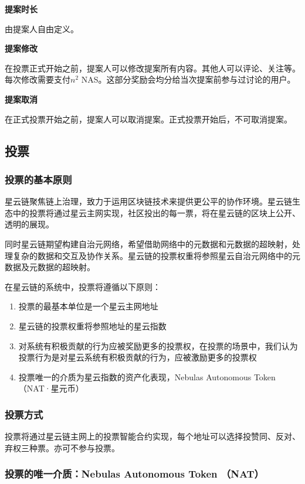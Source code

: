\textbf{提案时长}

由提案人自由定义。

\textbf{提案修改}

在投票正式开始之前，提案人可以修改提案所有内容。其他人可以评论、关注等。每次修改需要支付$n^2$ NAS。这部分奖励会均分给当次提案前参与过讨论的用户。

\textbf{提案取消}

在正式投票开始之前，提案人可以取消提案。正式投票开始后，不可取消提案。

\subsection{投票}
\subsubsection{投票的基本原则}

星云链聚焦链上治理，致力于运用区块链技术来提供更公平的协作环境。星云链生态中的投票将通过星云主网实现，社区投出的每一票，将在星云链的区块上公开、透明的展现。

同时星云链期望构建自治元网络，希望借助网络中的元数据和元数据的超映射，处理复杂的数据和交互及协作关系。星云链的投票权重将参照星云自治元网络中的元数据及元数据的超映射。

在星云链的系统中，投票将遵循以下原则：
\begin{enumerate}
	\item 投票的最基本单位是一个星云主网地址
	\item 星云链的投票权重将参照地址的星云指数
	\item 对系统有积极贡献的行为应被奖励更多的投票权，在投票的场景中，我们认为投票行为是对星云系统有积极贡献的行为，应被激励更多的投票权
	\item 投票唯一的介质为星云指数的资产化表现，Nebulas Autonomous Token （NAT·星元币）
\end{enumerate}

\subsubsection{投票方式}

投票将通过星云链主网上的投票智能合约实现，每个地址可以选择投赞同、反对、弃权三种票。亦可不参与投票。

\subsubsection{投票的唯一介质：Nebulas Autonomous Token （NAT）}

